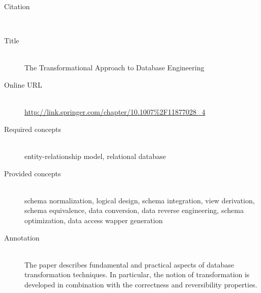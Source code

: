 \begin{description}
\item[Citation]\mbox{}\\
\cite{Hainaut06}
\item[Title]\mbox{}\\
The Transformational Approach to Database Engineering
\item[Online URL]\mbox{}\\
{\footnotesize\url{http://link.springer.com/chapter/10.1007%2F11877028_4}}
\item[Required concepts]\mbox{}\\
entity-relationship model, relational database\item[Provided concepts]\mbox{}\\
schema normalization, logical design, schema integration, view derivation, schema equivalence, data conversion, data reverse engineering, schema optimization, data access wapper generation\item[Annotation]\mbox{}\\
The paper describes fundamental and practical aspects of database transformation techniques. In particular, the notion of transformation is developed in combination with the correctness and reversibility properties.
\end{description}

